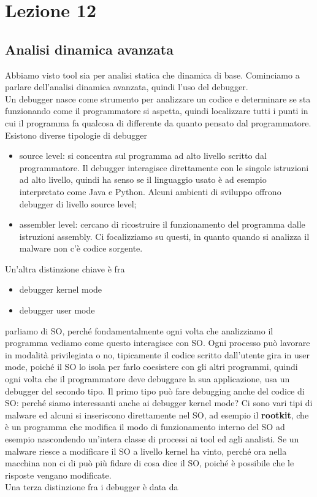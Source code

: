 \documentclass[12pt, oneside]{extbook}
\begin{document}
\chapter{Lezione 12}
\section{Analisi dinamica avanzata}
Abbiamo visto tool sia per analisi statica che dinamica di base. Cominciamo a parlare dell'analisi dinamica avanzata, quindi l'uso del debugger.\\ Un debugger nasce come strumento per analizzare un codice e determinare se sta funzionando come il programmatore si aspetta, quindi localizzare tutti i punti in cui il programma fa qualcosa di differente da quanto pensato dal programmatore. Esistono diverse tipologie di debugger
\begin{itemize}
\item source level: si concentra sul programma ad alto livello scritto dal programmatore. Il debugger interagisce direttamente con le singole istruzioni ad alto livello, quindi ha senso se il linguaggio usato è ad esempio interpretato come Java e Python. Alcuni ambienti di sviluppo offrono debugger di livello source level;
\item assembler level: cercano di ricostruire il funzionamento del programma dalle istruzioni assembly. Ci focalizziamo su questi, in quanto quando si analizza il malware non c'è codice sorgente.
\end{itemize}
Un'altra distinzione chiave è fra
\begin{itemize}
\item debugger kernel mode
\item debugger user mode
\end{itemize}
parliamo di SO, perché fondamentalmente ogni volta che analizziamo il programma vediamo come questo interagisce con SO. Ogni processo può lavorare in modalità privilegiata o no, tipicamente il codice scritto dall'utente gira in user mode, poiché il SO lo isola per farlo coesistere con gli altri programmi, quindi ogni volta che il programmatore deve debuggare la sua applicazione, usa un debugger del secondo tipo. Il primo tipo può fare debugging anche del codice di SO: perché siamo interessanti anche ai debugger kernel mode? Ci sono vari tipi di malware ed alcuni si inseriscono direttamente nel SO, ad esempio il \textbf{rootkit}, che è un programma che modifica il modo di funzionamento interno del SO ad esempio nascondendo un'intera classe di processi ai tool ed agli analisti. Se un malware riesce a modificare il SO a livello kernel ha vinto, perché ora nella macchina non ci di può più fidare di cosa dice il SO, poiché è possibile che le risposte vengano modificate.\\ Una terza distinzione fra i debugger è data da 
\end{document}
